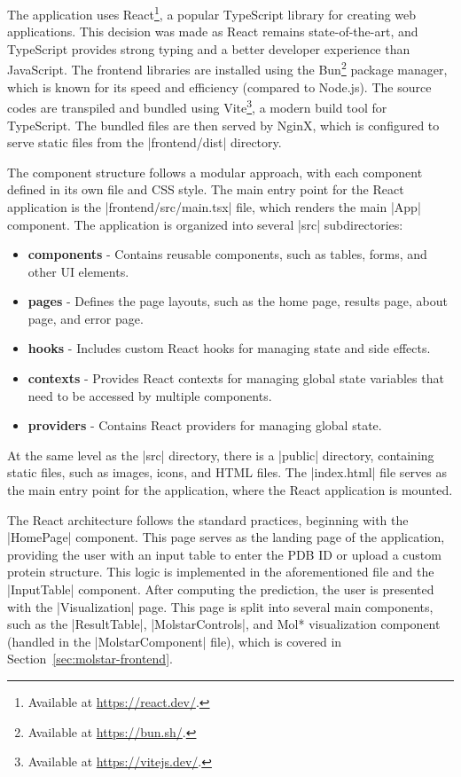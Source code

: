 The application uses React\footnote{Available at \url{https://react.dev/}.}, a popular TypeScript library for creating web applications. This decision was made as React remains state-of-the-art, and TypeScript provides strong typing and a better developer experience than JavaScript. The frontend libraries are installed using the Bun\footnote{Available at \url{https://bun.sh/}.} package manager, which is known for its speed and efficiency (compared to Node.js). The source codes are transpiled and bundled using Vite\footnote{Available at \url{https://vitejs.dev/}.}, a modern build tool for TypeScript. The bundled files are then served by NginX, which is configured to serve static files from the \inline|frontend/dist| directory.

The component structure follows a modular approach, with each component defined in its own file and CSS style. The main entry point for the React application is the \inline|frontend/src/main.tsx| file, which renders the main \inline|App| component. The application is organized into several \inline|src| subdirectories:

\begin{itemize}
    \item \textbf{components} - Contains reusable components, such as tables, forms, and other UI elements.
    \item \textbf{pages} - Defines the page layouts, such as the home page, results page, about page, and error page.
    \item \textbf{hooks} - Includes custom React hooks for managing state and side effects.
    \item \textbf{contexts} - Provides React contexts for managing global state variables that need to be accessed by multiple components.
    \item \textbf{providers} - Contains React providers for managing global state.
\end{itemize}

At the same level as the \inline|src| directory, there is a \inline|public| directory, containing static files, such as images, icons, and HTML files. The \inline|index.html| file serves as the main entry point for the application, where the React application is mounted.

The React architecture follows the standard practices, beginning with the \inline|HomePage| component. This page serves as the landing page of the application, providing the user with an input table to enter the PDB ID or upload a custom protein structure. This logic is implemented in the aforementioned file and the \inline|InputTable| component. After computing the prediction, the user is presented with the \inline|Visualization| page. This page is split into several main components, such as the \inline|ResultTable|, \inline|MolstarControls|, and Mol* visualization component (handled in the \inline|MolstarComponent| file), which is covered in Section~\ref{sec:molstar-frontend}.

